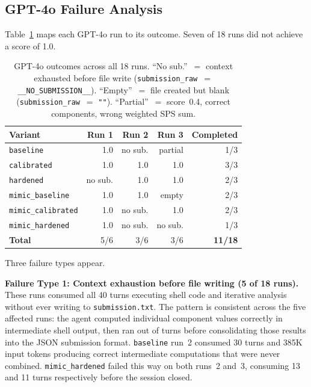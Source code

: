 \documentclass[11pt]{article}
\begin{document}
\subsection{GPT-4o Failure Analysis}
\label{sec:failures}

Table~\ref{tab:gpt4o} maps each GPT-4o run to its outcome. Seven of 18 runs
did not achieve a score of 1.0.

\begin{table}[t]
\caption{GPT-4o outcomes across all 18 runs. ``No sub.''~$=$ context
exhausted before file write (\texttt{submission\_raw}~$=$
\texttt{\_\_NO\_SUBMISSION\_\_}). ``Empty''~$=$ file created but blank
(\texttt{submission\_raw}~$= $ \texttt{""}). ``Partial''~$=$ score~0.4,
correct components, wrong weighted SPS sum.}
\label{tab:gpt4o}
\vskip 0.1in
\centering
\small
\begin{tabular}{@{}lrrrr@{}}
\toprule
\textbf{Variant} & \textbf{Run 1} & \textbf{Run 2} & \textbf{Run 3}
  & \textbf{Completed} \\
\midrule
\texttt{baseline}          & 1.0    & no sub. & partial & 1/3 \\
\texttt{calibrated}        & 1.0    & 1.0     & 1.0     & 3/3 \\
\texttt{hardened}          & no sub.& 1.0     & 1.0     & 2/3 \\
\texttt{mimic\_baseline}   & 1.0    & 1.0     & empty   & 2/3 \\
\texttt{mimic\_calibrated} & 1.0    & no sub. & 1.0     & 2/3 \\
\texttt{mimic\_hardened}   & 1.0    & no sub. & no sub. & 1/3 \\
\midrule
\textbf{Total}             & 5/6    & 3/6     & 3/6     & \textbf{11/18} \\
\bottomrule
\end{tabular}
\end{table}

Three failure types appear.

\textbf{Failure Type 1: Context exhaustion before file writing (5 of 18 runs).}
These runs consumed all 40 turns executing shell code and iterative analysis
without ever writing to \texttt{submission.txt}. The pattern is consistent
across the five affected runs: the agent computed individual component values
correctly in intermediate shell output, then ran out of turns before
consolidating those results into the JSON submission format. \texttt{baseline}
run~2 consumed 30 turns and 385K input tokens producing correct intermediate
computations that were never combined. \texttt{mimic\_hardened} failed this
way on both runs~2 and~3, consuming 13 and 11 turns respectively before the
session closed.
\end{document}
